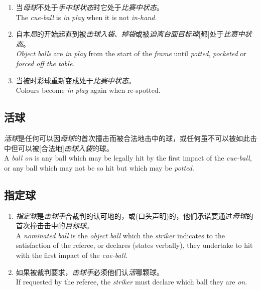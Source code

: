 \begin{enumerate}[label=(\alph*)]
    \item 当\textit{母球}不处于\textit{手中球状态}时它处于\textit{比赛中状态}。\\
    The \textit{cue-ball} is \textit{in play} when it is not \textit{in-hand}.
    \item 自本\textit{局}的开始起直到被\textit{击球入袋}、\textit{掉袋}或被\textit{迫离台面}\textit{目标球}[都]处于\textit{比赛中状态}。\\
    \textit{Object balls} are \textit{in play} from the start of the \textit{frame} until \textit{potted}, \textit{pocketed} or \textit{forced off the table}.
    \item 当被\respotted{}时彩球重新变成处于\textit{比赛中状态}。\\
    Colours become \textit{in play} again when re-spotted.
\end{enumerate}

\subsection{活球}

\noindent \textit{活球}是任何可以因\textit{母球}的首次撞击而被合法地击中的球，或任何虽不可以被如此击中但可以被[合法地]\textit{击球入袋}的球。\\
A \textit{ball on} is any ball which may be legally hit by the first impact of the \textit{cue-ball}, or any ball which may not be so hit but which may be \textit{potted}.

\subsection{指定球}

\begin{enumerate}[label=(\alph*)]
    \item \textit{指定球}是\textit{击球手}合裁判的认可地\indicate{}的，或\declare{}(口头声明)的，他们承诺要通过\textit{母球}的首次撞击击中的\textit{目标球}。\\
    A \textit{nominated ball} is the \textit{object ball} which the \textit{striker} indicates to the satisfaction of the referee, or declares (states verbally), they undertake to hit with the first impact of the \textit{cue-ball}.
    \item 如果被裁判要求，\textit{击球手}必须\declare{}他们认\textit{活}哪颗球。\\
    If requested by the referee, the \textit{striker} must declare which ball they are \textit{on}.
\end{enumerate}

